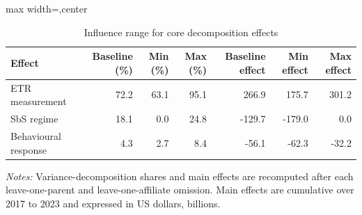 \begin{table}[H]
\centering
\footnotesize
\setlength{\tabcolsep}{2pt}
\caption{Influence range for core decomposition effects}
\label{tab:app_jurisdiction_influence_decomposition}
\begin{adjustbox}{max width=\textwidth,center}
\begin{tabular}{@{}lrrrrrr@{}}
\toprule
Effect & Baseline (\%) & Min (\%) & Max (\%) & Baseline effect & Min effect & Max effect \\
\midrule
ETR measurement & 72.2 & 63.1 & 95.1 &  266.9 &  175.7 & 301.2 \\
SbS regime & 18.1 &  0.0 & 24.8 & -129.7 & -179.0 &   0.0 \\
Behavioural response &  4.3 &  2.7 &  8.4 &  -56.1 &  -62.3 & -32.2 \\
\bottomrule
\end{tabular}
\end{adjustbox}

\vspace{0.35em}
\noindent\begin{minipage}{\textwidth}
\footnotesize\raggedright\textit{Notes:} Variance-decomposition shares and main effects are recomputed after each leave-one-parent and leave-one-affiliate omission. Main effects are cumulative over 2017 to 2023 and expressed in US dollars, billions.
\end{minipage}
\end{table}
